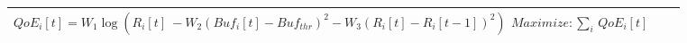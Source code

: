 \begin{landscape}
\begin{center}
\begin{longtable}[!h]{| C{8cm} | C{14cm} | C{3cm} |}
			\hline
			$Qo{{E}_{i}}\left[ t \right]={{W}_{1}}\log \left({{R}_{i}}\left[ t \right]~-{{W}_{2}}{{\left( Bu{{f}_{i}}\left[ t \right]-Bu{{f}_{thr}} \right)}^{2}}-{{W}_{3}}{{\left( {{R}_{i}}\left[ t \right]-{{R}_{i}}\left[ t-1 \right] \right)}^{2}}\right)$ \newline $Maximize:\underset{i}{\mathop \sum }\,Qo{{E}_{i}}\left[ t \right]$ & &  \\
			\hline
		\end{longtable}
	\end{center}
\end{landscape}